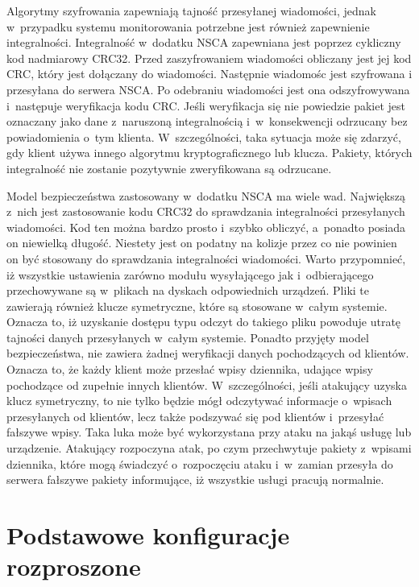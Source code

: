 Algorytmy szyfrowania zapewniają tajność przesyłanej wiadomości,
jednak w~przypadku systemu monitorowania potrzebne jest również
zapewnienie integralności. Integralność w~dodatku NSCA zapewniana jest
poprzez cykliczny kod nadmiarowy CRC32. Przed zaszyfrowaniem
wiadomości obliczany jest jej kod CRC, który jest dołączany do
wiadomości. Następnie wiadomośc jest szyfrowana i przesyłana do
serwera NSCA. Po odebraniu wiadomości jest ona odszyfrowywana
i~następuje weryfikacja kodu CRC. Jeśli weryfikacja się nie powiedzie
pakiet jest oznaczany jako dane z~naruszoną integralnością
i~w~konsekwencji odrzucany bez powiadomienia o~tym
klienta. W~szczególności, taka sytuacja może się zdarzyć, gdy klient
używa innego algorytmu kryptograficznego lub klucza. Pakiety, których
integralność nie zostanie pozytywnie zweryfikowana są odrzucane.

Model bezpieczeństwa zastosowany w~dodatku NSCA ma wiele
wad. Największą z~nich jest zastosowanie kodu CRC32 do sprawdzania
integralności przesyłanych wiadomości. Kod ten można bardzo prosto
i~szybko obliczyć, a~ponadto posiada on niewielką długość. Niestety
jest on podatny na kolizje przez co nie powinien on być stosowany do
sprawdzania integralności wiadomości. Warto przypomnieć, iż wszystkie
ustawienia zarówno modułu wysyłającego jak i~odbierającego
przechowywane są w~plikach na dyskach odpowiednich urządzeń. Pliki te
zawierają również klucze symetryczne, które są stosowane w~całym
systemie. Oznacza to, iż uzyskanie dostępu typu odczyt do takiego
pliku powoduje utratę tajności danych przesyłanych w~całym
systemie. Ponadto przyjęty model bezpieczeństwa, nie zawiera żadnej
weryfikacji danych pochodzących od klientów. Oznacza to, że każdy
klient może przesłać wpisy dziennika, udające wpisy pochodzące od
zupełnie innych klientów. W~szczególności, jeśli atakujący uzyska klucz
symetryczny, to nie tylko będzie mógł odczytywać informacje o~wpisach
przesyłanych od klientów, lecz także podszywać się pod klientów
i~przesyłać fałszywe wpisy. Taka luka może być wykorzystana przy ataku
na jakąś usługę lub urządzenie. Atakujący rozpoczyna atak, po czym
przechwytuje pakiety z~wpisami dziennika, które mogą świadczyć
o~rozpoczęciu ataku i~w~zamian przesyła do serwera fałszywe pakiety
informujące, iż wszystkie usługi pracują normalnie.

\section[Konfiguracje rozproszone][Podstawowe konfiguracje rozproszone]{Podstawowe konfiguracje rozproszone}

